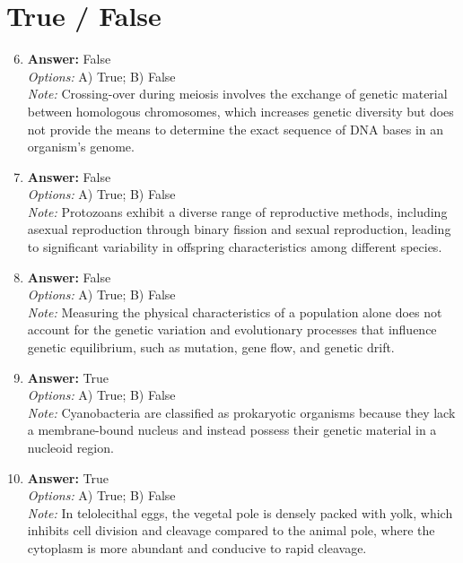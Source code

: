 \documentclass[12pt]{article}
\begin{document}
\section*{True / False}
\begin{enumerate}[label=\arabic*.]
\setcounter{enumi}{5}
\item \textbf{Answer:} False
\\ \textit{Options:} A) True; B) False
\\ \textit{Note:} Crossing-over during meiosis involves the exchange of genetic material between homologous chromosomes, which increases genetic diversity but does not provide the means to determine the exact sequence of DNA bases in an organism's genome.
\item \textbf{Answer:} False
\\ \textit{Options:} A) True; B) False
\\ \textit{Note:} Protozoans exhibit a diverse range of reproductive methods, including asexual reproduction through binary fission and sexual reproduction, leading to significant variability in offspring characteristics among different species.
\item \textbf{Answer:} False
\\ \textit{Options:} A) True; B) False
\\ \textit{Note:} Measuring the physical characteristics of a population alone does not account for the genetic variation and evolutionary processes that influence genetic equilibrium, such as mutation, gene flow, and genetic drift.
\item \textbf{Answer:} True
\\ \textit{Options:} A) True; B) False
\\ \textit{Note:} Cyanobacteria are classified as prokaryotic organisms because they lack a membrane-bound nucleus and instead possess their genetic material in a nucleoid region.
\item \textbf{Answer:} True
\\ \textit{Options:} A) True; B) False
\\ \textit{Note:} In telolecithal eggs, the vegetal pole is densely packed with yolk, which inhibits cell division and cleavage compared to the animal pole, where the cytoplasm is more abundant and conducive to rapid cleavage.
\end{enumerate}
\end{document}
